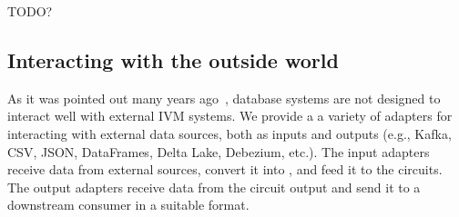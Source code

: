 TODO?

\subsection{Interacting with the outside world}

As it was pointed out many years ago~\cite{labio-vldb00}, database
systems are not designed to interact well with external IVM systems.
We provide a a variety of adapters for interacting with external data
sources, both as inputs and outputs (e.g., Kafka, CSV, JSON,
DataFrames, Delta Lake, Debezium, etc.).  The input adapters receive
data from external sources, convert it into \zrs, and feed it to the
circuits.  The output adapters receive data from the circuit output
and send it to a downstream consumer in a suitable format.

